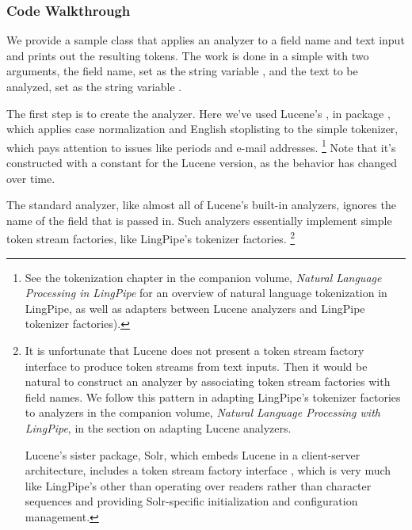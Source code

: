 \subsubsection{Code Walkthrough}

We provide a sample class  that applies an
analyzer to a field name and text input and prints out the resulting
tokens.  The work is done in a simple  with two
arguments, the field name, set as the string variable
, and the text to be analyzed, set as the string
variable .

The first step is to create the analyzer.
%
%
Here we've used Lucene's , in package
, which applies case
normalization and English stoplisting to the simple tokenizer, which
pays attention to issues like periods and e-mail addresses.%
%
\footnote{See the tokenization chapter in the companion volume, {\it
    Natural Language Processing in LingPipe} for an overview of
  natural language tokenization in LingPipe, as well as adapters
  between Lucene analyzers and LingPipe tokenizer factories).}
%
Note that it's constructed with a constant for the Lucene version, as
the behavior has changed over time.

The standard analyzer, like almost all of Lucene's built-in analyzers,
ignores the name of the field that is passed in.  Such analyzers
essentially implement simple token stream factories, like LingPipe's
tokenizer factories.%
%
\footnote{It is unfortunate that Lucene does not present a token
  stream factory interface to produce token streams from text inputs.
  Then it would be natural to construct an analyzer by associating
  token stream factories with field names.  We follow this pattern in
  adapting LingPipe's tokenizer factories to analyzers in the companion
  volume, {\it Natural Language Processing with LingPipe}, in the
  section on adapting Lucene analyzers.

Lucene's sister package, Solr, which embeds Lucene in a client-server
architecture, includes a token stream factory interface
, which is very much like LingPipe's other than
operating over readers rather than character sequences and providing
Solr-specific initialization and configuration management.}

